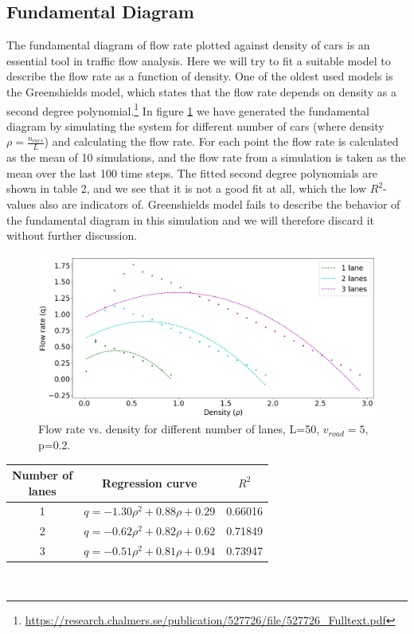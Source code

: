 \documentclass[a4paper,12pt]{article}
\begin{document}
\subsection{Fundamental Diagram}
The fundamental diagram of flow rate plotted against density of cars is an essential tool in traffic flow analysis. Here we will try to fit a suitable model to describe the flow rate as a function of density. One of the oldest used models is the Greenshields model, which states that the flow rate depends on density as a second degree polynomial.\footnote{\url{https://research.chalmers.se/publication/527726/file/527726_Fulltext.pdf}} In figure \ref{fig3} we have generated the fundamental diagram by simulating the system for different number of cars (where density $\rho = \frac{n_{cars}}{L}$) and calculating the flow rate. For each point the flow rate is calculated as the mean of 10 simulations, and the flow rate from a simulation is taken as the mean over the last 100 time steps. The fitted second degree polynomials are shown in table 2, and we see that it is not a good fit at all, which the low $R^2$-values also are indicators of. Greenshields model fails to describe the behavior of the fundamental diagram in this simulation and we will therefore discard it without further discussion.\\

\begin{figure}[H]
	\centering
        \includegraphics[scale=0.45]{fig3.png}
    \caption{Flow rate vs. density for different number of lanes, L=50, $v_{road}=5$, p=0.2.}
    \label{fig3}
\end{figure}

\begin{center}
\def\arraystretch{1.5}
\begin{tabular}{ |c|c|c| } 
 \hline
	\makecell{Number of\\ lanes} & Regression curve & $R^2$ \\
 \hline
	 1 & $q= -1.30\rho^2+0.88\rho+0.29$  & 0.66016  \\
	 2 & $q= -0.62\rho^2+0.82\rho+0.62$ & 0.71849 \\
	 3 &$ q= -0.51\rho^2+0.81\rho+0.94 $& 0.73947 \\
 \hline
\end{tabular}\\
\end{center}
\end{document}
